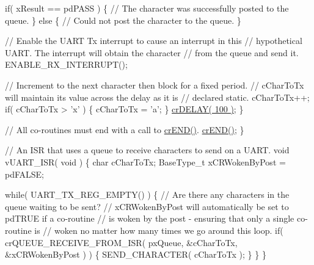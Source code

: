 \begin{DoxyPre}      if( xResult == pdPASS )
      \{
          // The character was successfully posted to the queue.
      \}
      else
      \{
         // Could not post the character to the queue.
      \}\end{DoxyPre}



\begin{DoxyPre}      // Enable the UART Tx interrupt to cause an interrupt in this
      // hypothetical UART.  The interrupt will obtain the character
      // from the queue and send it.
      ENABLE\_RX\_INTERRUPT();\end{DoxyPre}



\begin{DoxyPre}      // Increment to the next character then block for a fixed period.
      // cCharToTx will maintain its value across the delay as it is
      // declared static.
      cCharToTx++;
      if( cCharToTx > 'x' )
      \{
         cCharToTx = 'a';
      \}
      \hyperlink{vendor_2ceedling_2plugins_2freertos_2src_2freertos_2include_2croutine_8h_a05a06feb11028f2d1d440ea335f562ba}{crDELAY( 100 )};
  \}\end{DoxyPre}



\begin{DoxyPre}  // All co-routines must end with a call to \hyperlink{vendor_2ceedling_2plugins_2freertos_2src_2freertos_2include_2croutine_8h_ae6038cc976689b50000475ebfc4e2f23}{crEND()}.
  \hyperlink{vendor_2ceedling_2plugins_2freertos_2src_2freertos_2include_2croutine_8h_ae6038cc976689b50000475ebfc4e2f23}{crEND()};
\}\end{DoxyPre}



\begin{DoxyPre}// An ISR that uses a queue to receive characters to send on a UART.
void vUART\_ISR( void )
\{
char cCharToTx;
BaseType\_t xCRWokenByPost = pdFALSE;\end{DoxyPre}



\begin{DoxyPre}  while( UART\_TX\_REG\_EMPTY() )
  \{
      // Are there any characters in the queue waiting to be sent?
      // xCRWokenByPost will automatically be set to pdTRUE if a co-routine
      // is woken by the post - ensuring that only a single co-routine is
      // woken no matter how many times we go around this loop.
      if( crQUEUE\_RECEIVE\_FROM\_ISR( pxQueue, &cCharToTx, &xCRWokenByPost ) )
      \{
          SEND\_CHARACTER( cCharToTx );
      \}
  \}
\}
\end{DoxyPre}


